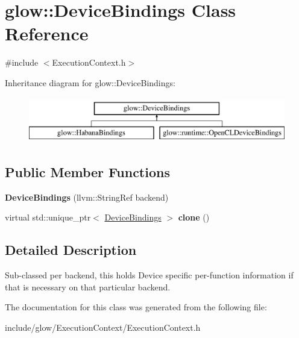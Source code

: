 \hypertarget{classglow_1_1_device_bindings}{}\section{glow\+:\+:Device\+Bindings Class Reference}
\label{classglow_1_1_device_bindings}


{\ttfamily \#include $<$Execution\+Context.\+h$>$}

Inheritance diagram for glow\+:\+:Device\+Bindings\+:\begin{figure}[H]
\begin{center}
\leavevmode
\includegraphics[height=2.000000cm]{classglow_1_1_device_bindings}
\end{center}
\end{figure}
\subsection*{Public Member Functions}
\begin{DoxyCompactItemize}
\item 
\mbox{\label{classglow_1_1_device_bindings_a842f1dec2c48b5f118dc47c50b6fb622}} 
{\bfseries Device\+Bindings} (llvm\+::\+String\+Ref backend)
\item 
\mbox{\label{classglow_1_1_device_bindings_acff6422c38ba254467a6f81f98fdb280}} 
virtual std\+::unique\+\_\+ptr$<$ \hyperlink{classglow_1_1_device_bindings}{Device\+Bindings} $>$ {\bfseries clone} ()
\end{DoxyCompactItemize}


\subsection{Detailed Description}
Sub-\/classed per backend, this holds Device specific per-\/function information if that is necessary on that particular backend. 

The documentation for this class was generated from the following file\+:\begin{DoxyCompactItemize}
\item 
include/glow/\+Execution\+Context/Execution\+Context.\+h\end{DoxyCompactItemize}
